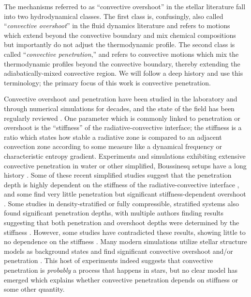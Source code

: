 \documentclass{aastex631}
\begin{document}
The mechanisms referred to as ``convective overshoot'' in the stellar literature fall into two hydrodynamical classes.
The first class is, confusingly, also called ``\emph{convective overshoot}'' in the fluid dynamics literature and refers to motions which extend beyond the convective boundary and mix chemical compositions but importantly do not adjust the thermodynamic profile.
The second class is called ``\emph{convective penetration},'' and refers to convective motions which mix the thermodynamic profiles beyond the convective boundary, thereby extending the adiabatically-mixed convective region.
We will follow a deep history \citep{zahn1991, brummell_etal_2002, korre_etal_2019} and use this terminology; the primary focus of this work is convective penetration.

Convective overshoot and penetration have been studied in the laboratory and through numerical simulations for decades, and the state of the field has been regularly reviewed \citep[e.g.,][]{marcus_etal_1983, zahn1991, browning_etal_2004, rogers_etal_2006, viallet_etal_2015, korre_etal_2019}.
One parameter which is commonly linked to penetration or overshoot is the ``stiffness'' of the radiative-convective interface; the stiffness is a ratio which states how stable a radiative zone is compared to an adjacent convection zone according to some measure like a dynamical frequency or characteristic entropy gradient.
Experiments and simulations exhibiting extensive convective penetration in water or other simplified, Boussinesq setups have a long history \citep{ musman1968, deardorff_etal_1969, moore_weiss_1973}.
Some of these recent simplified studies suggest that the penetration depth is highly dependent on the stiffness of the radiative-convective interface \citep{couston_etal_2017, toppaladoddi_wettlaufer_2018}, and some find very little penetration but significant stiffness-dependent overshoot \citep{korre_etal_2019}.
Some studies in density-stratified or fully compressible, stratified systems \citep[e.g.,][]{hurlburt_etal_1986, saikia_etal_2000} also found significant penetration depths, with multiple authors finding results suggesting that both penetration and overshoot depths were determined by the stiffness \citep{hurlburt_etal_1994, singh_etal_1995, browning_etal_2004, dietrich_wicht_2018}.
However, some studies have contradicted these results, showing little to no dependence on the stiffness \citep{brummell_etal_2002, rogers_glatzmaier_2005}.
Many modern simulations utilize stellar structure models as background states and find significant convective overshoot and/or penetration \citep{browning_etal_2004, rogers_etal_2006, kitiashvili_etal_2016, brun_etal_2017, pratt_etal_2017, higl_etal_2021}.
This host of experiments indeed suggests that convective penetration is \emph{probably} a process that happens in stars, but no clear model has emerged which explains whether convective penetration depends on stiffness or some other quantity.
\end{document}
